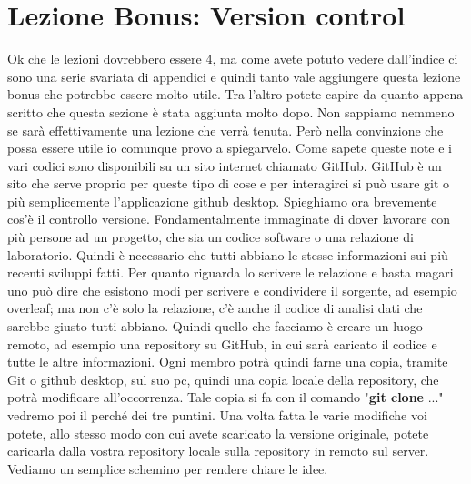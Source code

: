 \documentclass[10pt,a4paper]{article}
\begin{document}
\section{Lezione Bonus: Version control}
Ok che le lezioni dovrebbero essere 4, ma come avete potuto vedere dall'indice ci sono una serie svariata di appendici e quindi tanto vale aggiungere questa lezione bonus che potrebbe essere molto utile. Tra l'altro potete capire da quanto appena scritto che questa sezione è stata aggiunta molto dopo. Non sappiamo nemmeno se sarà effettivamente una lezione che verrà tenuta. Però nella convinzione che possa essere utile io comunque provo a spiegarvelo. Come sapete queste note e i vari codici sono disponibili su un sito internet chiamato GitHub. GitHub è un sito che serve proprio per queste tipo di cose e per interagirci si può usare git o più semplicemente l'applicazione github desktop. Spieghiamo ora brevemente cos'è il controllo versione. Fondamentalmente immaginate di dover lavorare con più persone ad un progetto, che sia un codice software o una relazione di laboratorio. Quindi è necessario che tutti abbiano le stesse informazioni sui più recenti sviluppi fatti. Per quanto riguarda lo scrivere le relazione e basta magari uno può dire che esistono modi per scrivere e condividere il sorgente, ad esempio overleaf; ma non c'è solo la relazione, c'è anche il codice di analisi dati che sarebbe giusto tutti abbiano. Quindi quello che facciamo è creare un luogo remoto, ad esempio una repository su GitHub, in cui sarà caricato il codice e tutte le altre informazioni. Ogni membro potrà quindi farne una copia, tramite Git o github desktop, sul suo pc, quindi una copia locale della repository, che potrà modificare all'occorrenza. Tale copia si fa con il comando "\textbf{git clone} ..." vedremo poi il perché dei tre puntini. Una volta fatta le varie modifiche voi potete, allo stesso modo con cui avete scaricato la versione originale, potete caricarla dalla vostra repository locale sulla repository in remoto sul server. Vediamo un semplice schemino per rendere chiare le idee.
\end{document}
